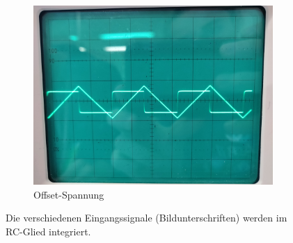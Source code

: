 \begin{figure}
\begin{subfigure}[b]{0.475\textwidth}
            \includegraphics[width=\textwidth]{content/data/rechteck2.jpg}
            \caption[]%
            {{\small Offset-Spannung}}    
            \label{fig:mean and std of net44}
        \end{subfigure}
        \caption[]
        {\small Die verschiedenen Eingangssignale (Bildunterschriften) werden im RC-Glied integriert.} 
        \label{fig:integrable}
    \end{figure}
